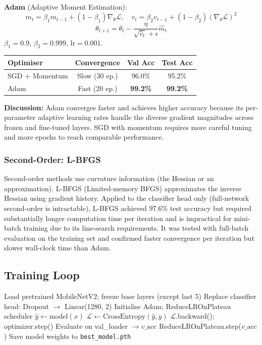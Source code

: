 \documentclass[10pt,twocolumn]{article}
\begin{document}
\textbf{Adam} (Adaptive Moment Estimation):
\[
m_t = \beta_1 m_{t-1} + (1-\beta_1)\nabla_\theta \mathcal{L}, \quad
v_t = \beta_2 v_{t-1} + (1-\beta_2)(\nabla_\theta \mathcal{L})^2
\]
\[
\theta_{t+1} = \theta_t - \frac{\eta}{\sqrt{\hat{v}_t}+\epsilon}\hat{m}_t
\]
$\beta_1=0.9$, $\beta_2=0.999$, lr$=0.001$.

\begin{center}
\small
\begin{tabular}{lccc}
\toprule
\textbf{Optimiser} & \textbf{Convergence} & \textbf{Val Acc} & \textbf{Test Acc} \\
\midrule
SGD + Momentum & Slow (30 ep.) & 96.0\% & 95.2\% \\
Adam           & Fast (20 ep.) & \textbf{99.2\%} & \textbf{99.2\%} \\
\bottomrule
\end{tabular}
\end{center}

\textbf{Discussion:} Adam converges faster and achieves higher accuracy because its per-parameter adaptive learning rates handle the diverse gradient magnitudes across frozen and fine-tuned layers. SGD with momentum requires more careful tuning and more epochs to reach comparable performance.

\subsubsection*{Second-Order: L-BFGS}

Second-order methods use curvature information (the Hessian or an approximation). L-BFGS (Limited-memory BFGS) approximates the inverse Hessian using gradient history. Applied to the classifier head only (full-network second-order is intractable), L-BFGS achieved 97.6\% test accuracy but required substantially longer computation time per iteration and is impractical for mini-batch training due to its line-search requirements. It was tested with full-batch evaluation on the training set and confirmed faster convergence per iteration but slower wall-clock time than Adam.

\subsection*{Training Loop}

\begin{algorithm}[H]
\small
\caption{CNN Training Loop (Adam)}
\begin{algorithmic}[1]
\State Load pretrained MobileNetV2; freeze base layers (except last 5)
\State Replace classifier head: Dropout $\to$ Linear(1280, 2)
\State Initialise Adam; ReduceLROnPlateau scheduler
    \State $\hat{y} \gets \text{model}(x)$
    \State $\mathcal{L} \gets \text{CrossEntropy}(\hat{y}, y)$
    \State $\mathcal{L}$.backward(); optimizer.step()
  \EndFor
  \State Evaluate on val\_loader $\to v\_\text{acc}$
  \State ReduceLROnPlateau.step($v\_\text{acc}$)
    \State Save model weights to \texttt{best\_model.pth}
  \EndIf
\EndFor
\end{algorithmic}
\end{algorithm}
\end{document}
